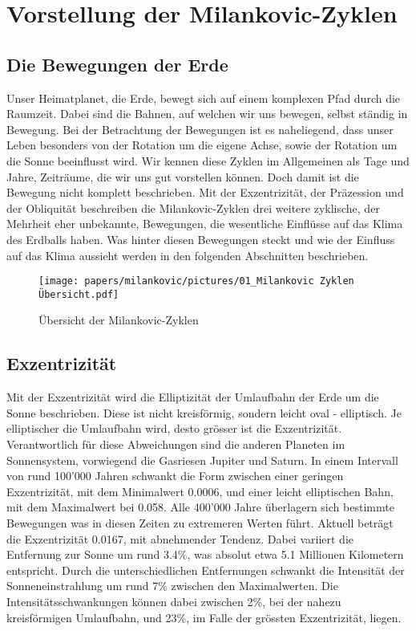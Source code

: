 %
%
%
%
\section{Vorstellung der Milankovic-Zyklen
\label{milankovic:section:teil1}}

\subsection{Die Bewegungen der Erde
\label{milankovic:subsection:Bewegungen der Erde}}
Unser Heimatplanet, die Erde, bewegt sich auf einem komplexen Pfad durch die Raumzeit.
Dabei sind die Bahnen, auf welchen wir uns bewegen, selbst ständig in Bewegung.
Bei der Betrachtung der Bewegungen ist es naheliegend, dass unser Leben besonders von der Rotation um die eigene Achse, sowie der Rotation um die Sonne beeinflusst wird.
Wir kennen diese Zyklen im Allgemeinen als Tage und Jahre, Zeiträume, die wir uns gut vorstellen können.
Doch damit ist die Bewegung nicht komplett beschrieben.
Mit der Exzentrizität, der Präzession und der Obliquität beschreiben die Milankovic-Zyklen drei weitere zyklische, der Mehrheit eher unbekannte, Bewegungen, die wesentliche Einflüsse auf das Klima des Erdballs haben.
Was hinter diesen Bewegungen steckt und wie der Einfluss auf das Klima aussieht werden in den folgenden Abschnitten beschrieben.

\begin{figure}
	\centering
	\texttt{[image: papers/milankovic/pictures/01\_Milankovic Zyklen Übersicht.pdf]}
	\caption{Übersicht der Milankovic-Zyklen
		\label{picture Übersicht Milankovic-Zyklen}}
\end{figure}

\subsection{Exzentrizität
\label{milankovic:subsection:Exzentrizität}}
Mit der Exzentrizität wird die Elliptizität der Umlaufbahn der Erde um die Sonne beschrieben.
Diese ist nicht kreisförmig, sondern leicht oval - elliptisch.
Je elliptischer die Umlaufbahn wird, desto grösser ist die Exzentrizität.
Verantwortlich für diese Abweichungen sind die anderen Planeten im Sonnensystem, vorwiegend die Gasriesen Jupiter und Saturn.
In einem Intervall von rund 100'000 Jahren schwankt die Form zwischen einer geringen Exzentrizität, mit dem Minimalwert 0.0006, und einer leicht elliptischen Bahn, mit dem Maximalwert bei 0.058.
Alle 400'000 Jahre überlagern sich bestimmte Bewegungen was in diesen Zeiten zu extremeren Werten führt.
Aktuell beträgt die Exzentrizität 0.0167, mit abnehmender Tendenz.
Dabei variiert die Entfernung zur Sonne um rund 3.4\%, was absolut etwa 5.1 Millionen Kilometern entspricht.
Durch die unterschiedlichen Entfernungen schwankt die Intensität der Sonneneinstrahlung um rund 7\% zwischen den Maximalwerten.
Die Intensitätsschwankungen können dabei zwischen 2\%, bei der nahezu kreisförmigen Umlaufbahn, und 23\%, im Falle der grössten Exzentrizität, liegen.

